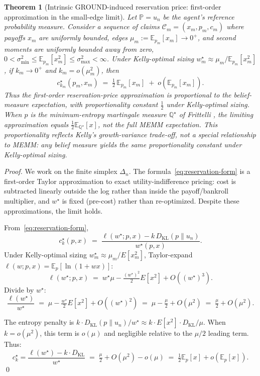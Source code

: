 \documentclass[11pt]{article}
\newtheorem{theorem}{Theorem}
\theoremstyle{definition}
\theoremstyle{remark}
\newcommand{\E}{\mathbb{E}}
\newcommand{\PP}{\mathbb{P}}
\newcommand{\Q}{\mathbb{Q}}
\newcommand{\C}{\mathcal{C}}
\newcommand{\KL}{D_{\mathrm{KL}}}
\begin{document}
\begin{theorem}[Intrinsic GROUND-induced reservation price: first-order approximation in the small-edge limit]\label{thm:memm}
Let $\PP = u_n$ be the agent's reference probability measure.
Consider a sequence of claims $\C_m = (x_m, p_m, c_m)$ where payoffs $x_m$ are uniformly bounded,
edges $\mu_m := \E_{p_m}[x_m] \to 0^+$, and second moments are uniformly bounded away from zero,
$0 < \sigma_{\min}^2 \le \E_{p_m}[x_m^2] \le \sigma_{\max}^2 < \infty$. Under Kelly-optimal sizing
$w^\star_m \approx \mu_m / \E_{p_m}[x_m^2]$, if $k_m \to 0^+$ and $k_m = o(\mu_m^2)$, then
\begin{equation*}
c^\star_{k_m}(p_m, x_m) \;=\; \tfrac{1}{2}\,\E_{p_m}[x_m] \;+\; o(\E_{p_m}[x_m]).
\end{equation*}
Thus the first-order reservation-price approximation is proportional to the belief-measure expectation, with proportionality constant $\tfrac{1}{2}$ under Kelly-optimal sizing.
When $p$ is the minimum-entropy martingale measure $\Q^\star$ of Frittelli \cite{frittelli2000},
the limiting approximation equals $\tfrac{1}{2}\E_{\Q^\star}[x]$, not the full MEMM expectation. This proportionality
reflects Kelly's growth-variance trade-off, not a special relationship to MEMM: any belief measure
yields the same proportionality constant under Kelly-optimal sizing.
\end{theorem}

\begin{proof}
We work on the finite simplex $\Delta_n$. The formula~\eqref{eq:reservation-form} is a
first-order Taylor approximation to exact utility-indifference pricing: cost is subtracted linearly
outside the log rather than inside the payoff/bankroll multiplier, and $w^\star$ is fixed
(pre-cost) rather than re-optimized. Despite these approximations, the limit holds.

From~\eqref{eq:reservation-form},
\begin{equation*}
c^\star_k(p, x) \;=\; \frac{\ell(w^\star; p, x) - k \, \KL(p \| u_n)}{w^\star(p, x)}.
\end{equation*}
Under Kelly-optimal sizing $w^\star_m \approx \mu_m / E[x_m^2]$, Taylor-expand $\ell(w; p, x) = \E_p[\ln(1 + wx)]$:
\begin{equation*}
\ell(w^\star; p, x) \;=\; w^\star \mu - \tfrac{(w^\star)^2}{2} E[x^2] + O((w^\star)^3).
\end{equation*}
Divide by $w^\star$:
\begin{equation*}
\frac{\ell(w^\star)}{w^\star} \;=\; \mu - \tfrac{w^\star}{2} E[x^2] + O((w^\star)^2) \;=\; \mu - \tfrac{\mu}{2} + O(\mu^2) \;=\; \tfrac{\mu}{2} + O(\mu^2).
\end{equation*}

The entropy penalty is $k \cdot \KL(p \| u_n) / w^\star \approx k \cdot E[x^2] \cdot \KL / \mu$.
When $k = o(\mu^2)$, this term is $o(\mu)$ and negligible relative to the $\mu/2$ leading term. Thus:
\begin{equation*}
c^\star_k = \frac{\ell(w^\star) - k \cdot \KL}{w^\star} \;=\; \tfrac{\mu}{2} + O(\mu^2) - o(\mu) \;=\; \tfrac{1}{2}\E_p[x] + o(\E_p[x]).
\end{equation*}
\qed
\end{proof}
\end{document}
